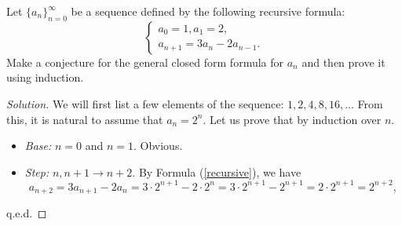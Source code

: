 




\begin{problem}
    Let $ \{a_n\}_{n = 0}^{\infty} $ be a sequence defined by the following recursive formula:
    \begin{equation}
        \begin{cases}
            a_0 = 1, a_1 = 2,\\
            a_{n+1} = 3 a_n - 2 a_{n-1}.
        \end{cases}
        \label{recursive}
    \end{equation}
    Make a conjecture for the general closed form formula for $ a_n $ and then prove it using induction.
\end{problem}
\begin{proof}[Solution]
    We will first list a few elements of the sequence: $ 1, 2, 4, 8, 16, ... $ From this, it is natural to assume that $ a_n = 2^n $. Let us prove that by induction over $n$.
    \begin{itemize}
        \item \textit{Base:} $n = 0$ and $n = 1$. Obvious.
        \item \textit{Step:} $n, n+1 \to n+2$. By Formula (\ref{recursive}), we have
            \[
                a_{n+2} = 3 a_{n+1} - 2 a_{n} = 3 \cdot 2^{n+1} - 2 \cdot 2^n = 3 \cdot 2^{n+1} - 2^{n+1} = 2 \cdot 2^{n+1} = 2^{n+2},
            \]
    \end{itemize}
    q.e.d.
\end{proof}

